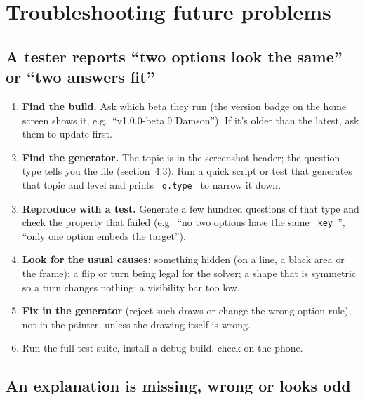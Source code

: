 \documentclass[12pt,a4paper]{article}
\newcommand{\codebs}{\symbol{92}\penalty50\relax}
\newcommand{\code}[1]{\texttt{\let\textbackslash\codebs\XeTeXinterchartokenstate=1 #1\XeTeXinterchartokenstate=0 }}
\begin{document}
\section{Troubleshooting future problems}\label{sec:troubleshooting}

\subsection{A tester reports ``two options look the same'' or ``two answers fit''}

\begin{enumerate}
\item \textbf{Find the build.} Ask which beta they run (the version badge on the home screen shows it, e.g.\ ``v1.0.0-beta.9 Damson''). If it's older than the latest, ask them to update first.
\item \textbf{Find the generator.} The topic is in the screenshot header; the question type tells you the file (section~4.3). Run a quick script or test that generates that topic and level and prints \code{q.type} to narrow it down.
\item \textbf{Reproduce with a test.} Generate a few hundred questions of that type and check the property that failed (e.g.\ ``no two options have the same \code{key}'', ``only one option embeds the target'').
\item \textbf{Look for the usual causes:} something hidden (on a line, a black area or the frame); a flip or turn being legal for the solver; a shape that is symmetric so a turn changes nothing; a visibility bar too low.
\item \textbf{Fix in the generator} (reject such draws or change the wrong-option rule), not in the painter, unless the drawing itself is wrong.
\item Run the full test suite, install a debug build, check on the phone.
\end{enumerate}

\subsection{An explanation is missing, wrong or looks odd}
\end{document}
